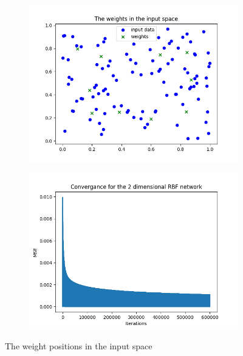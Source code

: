 \documentclass[a4paper]{article}
\begin{document}
\begin{figure}[ht]
    \centering
    \begin{subfigure}{0.4\textwidth}
        \centering
        \includegraphics[width=\textwidth]{Labs/Lab 2/Steinar/results/weights-cl.png}
    \end{subfigure}
    \hfill
    \begin{subfigure}{0.4\textwidth}
        \centering
        \includegraphics[width=\textwidth]{Labs/Lab 2/Steinar/results/2-dim-convergance.png}
    \end{subfigure}
    \caption{The weight positions in the input space}
    \label{fig:cl-2-dim}
\end{figure}
\end{document}
